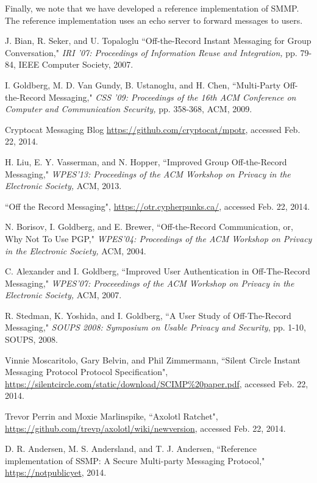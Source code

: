 \documentclass[%
preprint,
amsmath,amssymb,
aps,
prb,
floatfix,
]{revtex4-1}
\begin{document}
Finally, we note that we have developed a reference
implementation\cite{ref:referenceimplementation} of SMMP. The reference
implementation uses an echo server to forward messages to users.
\begin{thebibliography}{99}
 J. Bian, R. Seker, and U. Topaloglu ``Off-the-Record Instant
Messaging for Group Conversation," \textit{IRI '07: Proceedings of Information
Reuse and Integration,} pp. 79-84, IEEE Computer Society, 2007.

 I. Goldberg, M. D. Van Gundy, B. Ustanoglu, and H. Chen,
``Multi-Party Off-the-Record Messaging," \textit{CSS '09: Proceedings of the
16th ACM Conference on Computer and Communication Security,} pp. 358-368, ACM,
2009.

 Cryptocat Messaging Blog
\url{https://github.com/cryptocat/mpotr}, accessed Feb. 22, 2014.

 H. Liu, E. Y. Vasserman, and N. Hopper, ``Improved Group
Off-the-Record Messaging," \textit{WPES'13: Proceedings of the ACM Workshop on
Privacy in the Electronic Society,} ACM, 2013.

 ``Off the Record Messaging",
\url{https://otr.cypherpunks.ca/}, accessed Feb. 22, 2014.

 N. Borisov, I. Goldberg, and E. Brewer, ``Off-the-Record
Communication, or, Why Not To Use PGP," \textit{WPES'04: Proceedings of the
ACM Workshop on Privacy in the Electronic Society,} ACM, 2004.

 C. Alexander and I. Goldberg, ``Improved User Authentication
in Off-The-Record Messaging," \textit{WPES'07: Proceeedings of the ACM Workshop
on Privacy in the Electronic Society,} ACM, 2007.

 R. Stedman, K. Yoshida, and I. Goldberg, ``A User Study of
Off-The-Record Messaging," \textit{SOUPS 2008: Symposium on Usable Privacy and
Security}, pp. 1-10, SOUPS, 2008.

  Vinnie Moscaritolo, Gary Belvin, and Phil Zimmermann,
``Silent Circle Instant Messaging Protocol Protocol Specification",
\url{https://silentcircle.com/static/download/SCIMP%20paper.pdf}, accessed Feb.
22, 2014.

 Trevor Perrin and Moxie Marlinspike, ``Axolotl Ratchet",
\url{https://github.com/trevp/axolotl/wiki/newversion}, accessed Feb. 22, 2014.

 D. R. Andersen, M. S. Andersland, and T.
J. Andersen, ``Reference implementation of SSMP: A Secure Multi-party Messaging
Protocol," \url{https://notpublicyet}, 2014.

\end{thebibliography}
\end{document}
